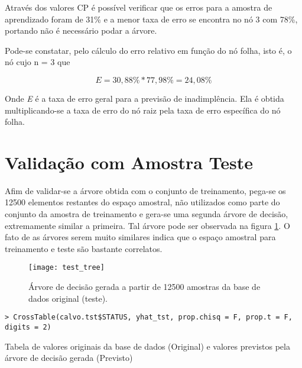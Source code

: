 Através dos valores CP é possível verificar que os erros para a amostra
de aprendizado foram de 31\% e a menor taxa de erro se encontra no
nó 3 com 78\%, portando não é necessário podar a árvore. 

Pode-se constatar, pelo cálculo do erro relativo em função do nó folha, isto é, o nó cujo n = 3 que

\[
E=30,88\%*77,98\%=24,08\%
\]

Onde \emph{E} é a taxa de erro geral para a previsão de inadimplência. Ela é obtida multiplicando-se a taxa de erro do nó raiz pela taxa de erro específica do nó folha.

\clearpage

\section{Validação com Amostra Teste}

Afim de validar-se a árvore obtida com o conjunto de treinamento, pega-se os 12500 elementos restantes do espaço amostral, não utilizados como parte do conjunto da amostra de treinamento e gera-se uma segunda árvore de decisão, extremamente similar a primeira. Tal árvore pode ser observada na figura \ref{fig:TestTree}. O fato de as árvores serem muito similares indica que o espaço amostral para treinamento e teste são bastante correlatos.

\begin{center}
\begin{figure}[h]
\begin{centering}
\texttt{[image: test\_tree]}
\par\end{centering}
\caption{\label{fig:TestTree}Árvore de decisão gerada a partir de 12500 amostras da base de dados original (teste).}
\end{figure}
\vspace*{-40pt}
\par\end{center}


\begin{verbatim}
> CrossTable(calvo.tst$STATUS, yhat_tst, prop.chisq = F, prop.t = F, digits = 2)
\end{verbatim}

\begin{table}[h]
\centering

  \caption{\label{tab:StatusPrevisao}Tabela de valores originais da base de dados (Original) e valores previstos pela árvore de decisão gerada (Previsto)}
\end{table}


